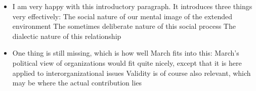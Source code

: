 \begin{itemize}
	\item I am very happy with this introductory paragraph. It introduces three things very effectively:
		\subitem The social nature of our mental image of the extended environment
		\subitem The sometimes deliberate nature of this social process
		\subitem The dialectic nature of this relationship
	\item One thing is still missing, which is how well March fits into this:
		\subitem March's political view of organizations would fit quite nicely, except that it is here applied to interorganizational issues
		\subitem Validity is of course also relevant, which may be where the actual contribution lies
\end{itemize}